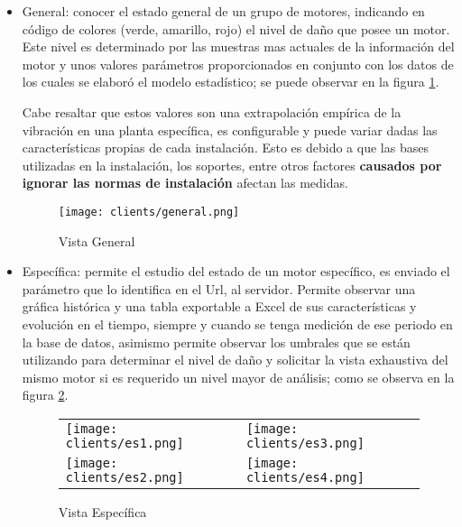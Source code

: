 \begin{itemize}
    \item General: conocer el estado general de un grupo de motores, indicando
        en código de colores (verde, amarillo, rojo) el nivel de daño que posee
        un motor. Este nivel es determinado por las muestras mas actuales de
        la información del motor y unos valores parámetros proporcionados en
        conjunto con los datos de los cuales se elaboró el modelo estadístico;
        se puede observar en la figura \ref{img:VistaGeneral}.

        Cabe resaltar que estos valores son una extrapolación empírica de la
        vibración en una planta específica, es configurable y puede variar dadas
        las características propias de cada instalación. Esto es debido a que
        las bases utilizadas en la instalación, los soportes, entre otros factores
        \textbf{causados por ignorar las normas de instalación} afectan las medidas.

\begin{center}
    \begin{figure}[htb]
		\centering
        \caption{Vista General}
        \texttt{[image: clients/general.png]}
        \label{img:VistaGeneral}
	\end{figure}
\end{center}

        \vspace{-1.3cm}
    \item Específica:  permite el estudio del estado de un motor específico,
        es enviado el parámetro que lo identifica en el Url, al servidor.
        Permite observar
        una gráfica histórica y una tabla exportable a Excel de sus características y
        evolución en el tiempo, siempre y cuando se tenga medición de ese periodo
        en la base de datos, asimismo permite observar los umbrales que se están
        utilizando para determinar el nivel de daño y solicitar la vista exhaustiva del
        mismo motor si es requerido un nivel mayor de análisis;
        como se observa en la figura \ref{img:VistaEspecifica}.

\begin{center}
    \begin{figure}[htb]
		\centering
        \caption{Vista Específica}
            \begin{tabular}{m{6cm}m{6cm}}
                \texttt{[image: clients/es1.png]}&
        \texttt{[image: clients/es3.png]}\\
                \texttt{[image: clients/es2.png]}&
        \texttt{[image: clients/es4.png]}
            \end{tabular}
        \label{img:VistaEspecifica}
	\end{figure}
\end{center}


\end{itemize}
